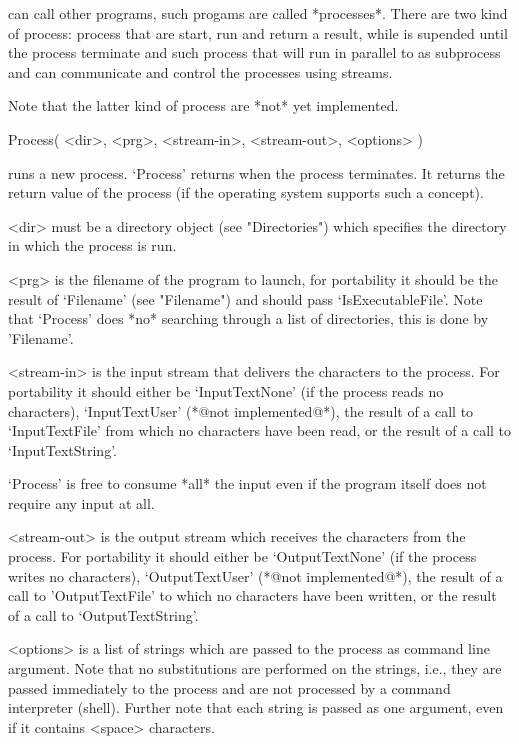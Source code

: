 
{\GAP} can  call other programs,  such   progams are called  *processes*.
There are two kind of  process: process that are  start, run and return a
result, while {\GAP}  is supended until the   process terminate and  such
process that will run in parallel to  {\GAP} as subprocess and {\GAP} can
communicate and control the processes using streams.

Note that the latter kind of process are *not* yet implemented.


\>Process( <dir>, <prg>, <stream-in>, <stream-out>, <options> )

runs  a new process.  `Process' returns  when the process terminates.  It
returns the return value of the process (if the operating system supports
such a concept).

<dir> must be a directory  object (see "Directories") which specifies the
directory in which the process is run.

<prg> is the filename of the program to launch, for portability it should
be   the  result  of   `Filename'   (see   "Filename") and   should  pass
`IsExecutableFile'.  Note that  `Process'  does *no* searching through  a
list of directories, this is done by 'Filename'.

<stream-in>  is the  input stream   that  delivers the characters  to the
process.   For portability it  should either  be `InputTextNone' (if  the
process reads  no characters), `InputTextUser' (*@not implemented@*), the
result  of a call to `InputTextFile'  from which  no characters have been
read, or the result of a call to `InputTextString'.

`Process' is  free to consume *all* the  input even if the program itself
does not require any input at all.

<stream-out> is the output stream  which receives the characters from the
process.  For portability it should   either be `OutputTextNone' (if  the
process writes  no  characters), `OutputTextUser' (*@not  implemented@*),
the result of a call to 'OutputTextFile' to which no characters have been
written, or the result of a call to `OutputTextString'.

<options> is a list of strings which are passed to the process as command
line argument.  Note that no  substitutions are performed on the strings,
i.e., they are passed immediately to the process and are not processed by
a command interpreter (shell).  Further  note that each string is  passed
as one argument, even if it contains <space> characters.

